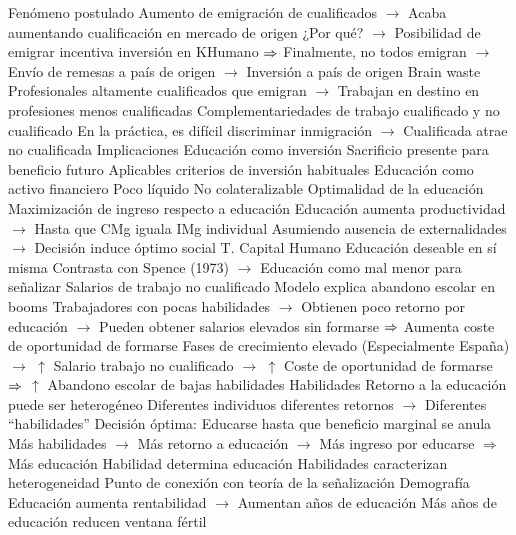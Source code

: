 \documentclass{nuevotema}
\begin{document}
\begin{esquemal}
				\4[] Fenómeno postulado
				\4[] Aumento de emigración de cualificados
				\4[] $\to$ Acaba aumentando cualificación en mercado de origen
				\4[] ¿Por qué?
				\4[] $\to$ Posibilidad de emigrar incentiva inversión en KHumano
				\4[] $\then$ Finalmente, no todos emigran
				\4[] $\to$ Envío de remesas a país de origen
				\4[] $\to$ Inversión a país de origen
				\4 Brain waste
				\4[] Profesionales altamente cualificados que emigran
				\4[] $\to$ Trabajan en destino en profesiones menos cualificadas
				\4 Complementariedades de trabajo cualificado y no cualificado
				\4[] En la práctica, es difícil discriminar inmigración
				\4[] $\to$ Cualificada atrae no cualificada
		\2 Implicaciones
			\3 Educación como inversión
				\4 Sacrificio presente para beneficio futuro
				\4 Aplicables criterios de inversión habituales
				\4 Educación como activo financiero
				\4[] Poco líquido
				\4[] No colateralizable
			\3 Optimalidad de la educación
				\4 Maximización de ingreso respecto a educación
				\4[] Educación aumenta productividad
				\4[] $\to$ Hasta que CMg iguala IMg individual
				\4 Asumiendo ausencia de externalidades
				\4[] $\to$ Decisión induce óptimo social
				\4[$\then$] T. Capital Humano
				\4[] Educación deseable en sí misma
				\4[] Contrasta con Spence (1973)
				\4[] $\to$ Educación como mal menor para señalizar
			\3 Salarios de trabajo no cualificado
				\4 Modelo explica abandono escolar en booms
				\4[] Trabajadores con pocas habilidades
				\4[] $\to$ Obtienen poco retorno por educación
				\4[] $\to$ Pueden obtener salarios elevados sin formarse
				\4[] $\then$ Aumenta coste de oportunidad de formarse
				\4 Fases de crecimiento elevado
				\4[] (Especialmente España)
				\4[] $\to$ $\uparrow$ Salario trabajo no cualificado
				\4[] $\to$ $\uparrow$ Coste de oportunidad de formarse
				\4[] $\then$ $\uparrow$ Abandono escolar de bajas habilidades
			\3 Habilidades
				\4 Retorno a la educación puede ser heterogéneo
				\4[] Diferentes individuos diferentes retornos
				\4[] $\to$ Diferentes ``habilidades''
				\4 Decisión óptima:
				\4[] Educarse hasta que beneficio marginal se anula
				\4[] Más habilidades
				\4[] $\to$ Más retorno a educación
				\4[] $\to$ Más ingreso por educarse
				\4[] $\Rightarrow$ Más educación
				\4[$\Rightarrow$] Habilidad determina educación
				\4[] Habilidades caracterizan heterogeneidad
				\4 Punto de conexión con teoría de la señalización
			\3 Demografía
				\4 Educación aumenta rentabilidad
				\4[] $\to$ Aumentan años de educación
				\4 Más años de educación reducen ventana fértil

\end{esquemal}
\end{document}
